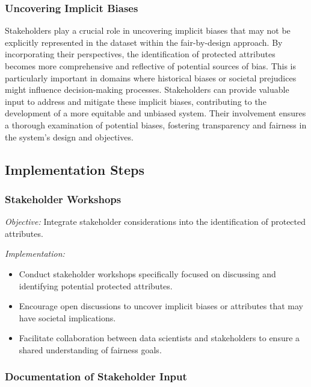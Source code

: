 \documentclass[12pt,a4paper,openright,twoside]{book}
\begin{document}
\subsubsection{Uncovering Implicit Biases}

Stakeholders play a crucial role in uncovering implicit biases that may not be explicitly represented in the dataset within the fair-by-design approach. By incorporating their perspectives, the identification of protected attributes becomes more comprehensive and reflective of potential sources of bias. This is particularly important in domains where historical biases or societal prejudices might influence decision-making processes. Stakeholders can provide valuable input to address and mitigate these implicit biases, contributing to the development of a more equitable and unbiased system. Their involvement ensures a thorough examination of potential biases, fostering transparency and fairness in the system's design and objectives.

\subsection{Implementation Steps}

\subsubsection{Stakeholder Workshops}

\emph{Objective:} Integrate stakeholder considerations into the identification of protected attributes.

\emph{Implementation:}

\begin{itemize}

    \item Conduct stakeholder workshops specifically focused on discussing and identifying potential protected attributes.

    \item Encourage open discussions to uncover implicit biases or attributes that may have societal implications.

    \item Facilitate collaboration between data scientists and stakeholders to ensure a shared understanding of fairness goals.

\end{itemize}

\subsubsection{Documentation of Stakeholder Input}
\end{document}
